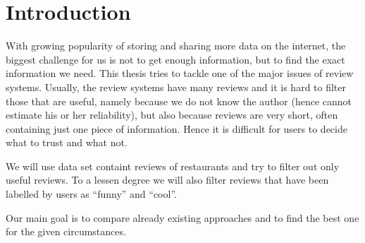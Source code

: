 \chapter*{Introduction}

With growing popularity of storing and sharing more data on the internet, the biggest challenge
for us is not to get enough information, but to find the exact information we need. This thesis tries to tackle
one of the major issues of review systems. Usually, the review systems have many reviews and it is
hard to filter those that are useful, namely because we do not know the author (hence cannot estimate
his or her reliability), but also because reviews are very short, often containing just one piece of information.
Hence it is difficult for users to decide what to trust and what not.

We will use data set containt reviews of restaurants and try to 
filter out only useful reviews. To a lessen degree we will also filter reviews that have been labelled by users as ``funny'' and ``cool''.

Our main goal is to compare already existing approaches and to find the best one for the given circumstances.

